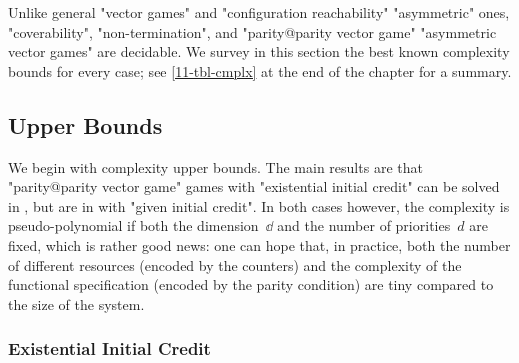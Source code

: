 Unlike general "vector games" and "configuration reachability"
"asymmetric" ones, "coverability", "non-termination", and
"parity@parity vector game" "asymmetric vector games" are decidable.
We survey in this section the best known complexity bounds for every
case; see \cref{11-tbl-cmplx} at the end of the chapter for a summary.

\subsection{Upper Bounds}
\label{11-subsec:up}
We begin with complexity upper bounds.  The main results are that
"parity@parity vector game" games with "existential initial credit"
can be solved in \coNP, but are in \kEXP[2] with "given initial
credit".  In both cases however, the complexity is pseudo-polynomial
if both the dimension~$\dd$ and the number of priorities~$d$ are
fixed, which is rather good news: one can hope that, in practice, both
the number of different resources (encoded by the counters) and the
complexity of the functional specification (encoded by the parity
condition) are tiny compared to the size of the system.

%
\subsubsection{Existential Initial Credit}
\label{11-subsec:up-exist}

